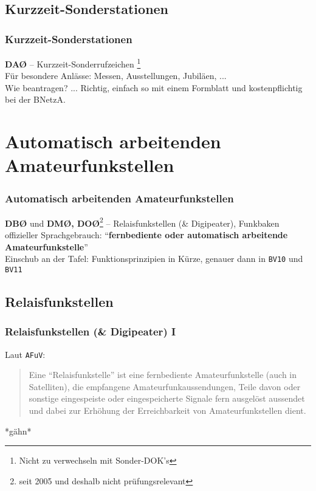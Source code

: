 \subsection{Kurzzeit-Sonderstationen}

\begin{frame}
  \frametitle{Kurzzeit-Sonderstationen}

  \textbf{DAØ} -- Kurzzeit-Sonderrufzeichen
  \footnote{Nicht zu verwechseln mit Sonder-DOK's}\\[1em]

  Für besondere Anlässe: Messen, Ausstellungen, Jubiläen, ... \\[3em]

  Wie beantragen? ... Richtig, einfach so mit einem Formblatt und
  kostenpflichtig bei der BNetzA.

\end{frame}

\section{Automatisch arbeitenden Amateurfunkstellen}

\begin{frame}
  \frametitle{Automatisch arbeitenden Amateurfunkstellen}

  \textbf{DBØ} und \textbf{DMØ, DOØ}\footnote{seit 2005 und deshalb nicht
  prüfungsrelevant} -- Relaisfunkstellen (\& Digipeater), Funkbaken \\[1em]

  offizieller Sprachgebrauch: ``\textbf{fernbediente oder automatisch arbeitende
  Amateurfunkstelle}'' \\[3em]

  Einschub an der Tafel: Funktionsprinzipien in Kürze, genauer dann in
  \texttt{BV10} und \texttt{BV11}

\end{frame}

\subsection{Relaisfunkstellen}

\begin{frame}
  \frametitle{Relaisfunkstellen (\& Digipeater) I}

  Laut \texttt{AFuV}: \\[1em]

  \begin{quote}
    Eine ``Relaisfunkstelle'' ist eine fernbediente Amateurfunkstelle
    (auch in Satelliten), die empfangene Amateurfunkaussendungen, Teile davon
    oder sonstige eingespeiste oder eingespeicherte Signale fern ausgelöst
    aussendet und dabei zur Erhöhung der Erreichbarkeit von Amateurfunkstellen
    dient.
  \end{quote}
  *gähn*

\end{frame}

